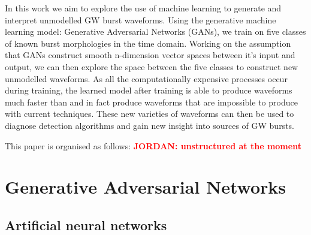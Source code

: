 \documentclass[12pt]{iopart}
\newcommand{\jordan}[1]{\textbf{\textcolor{red}{JORDAN: #1}}}
\begin{document}
%

In this work we aim to explore the use of machine learning to generate and interpret
unmodelled \ac{GW} burst waveforms. Using the generative machine learning model: Generative Adversarial Networks (GANs), we train on five classes of known burst morphologies in the time domain. Working on the assumption that GANs construct smooth n-dimension vector spaces between it's input and output, we can then explore the space between the five classes to construct new unmodelled waveforms. As all the computationally expensive processes occur during training, the learned model after training is able to produce waveforms much faster than and in fact produce waveforms that are impossible to produce with current techniques. These new varieties of waveforms can then be used to diagnose detection algorithms and gain new insight into sources of \ac{GW} bursts. 
%

This paper is organised as follows: \jordan{unstructured at the moment}


\section{Generative Adversarial Networks}

%
\subsection{Artificial neural networks}
\end{document}
